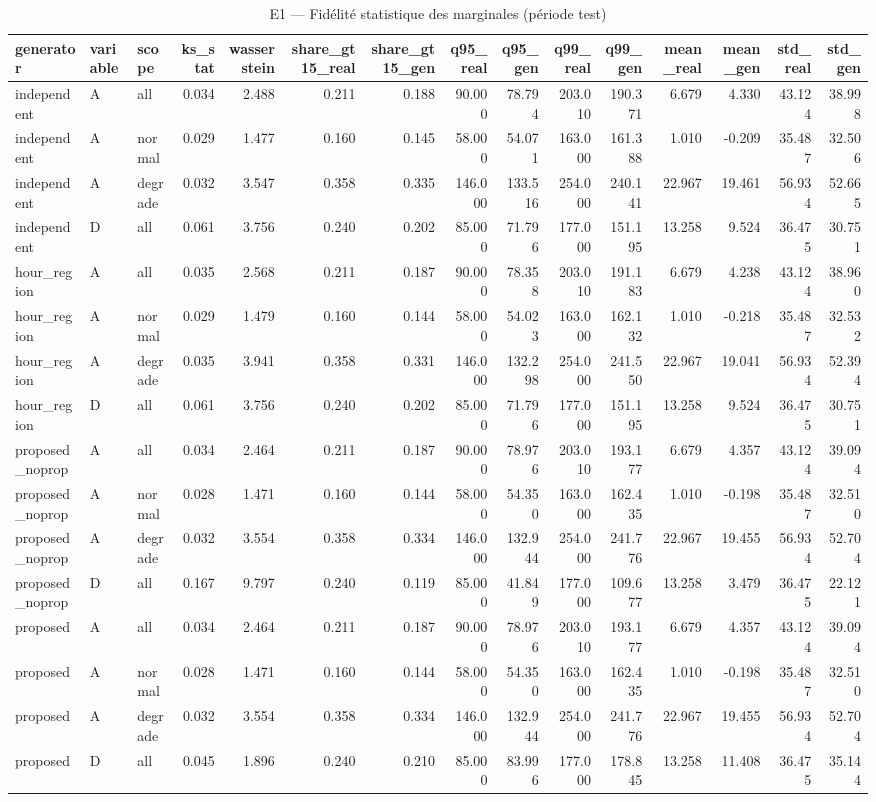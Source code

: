 \begin{table}
\caption{E1 — Fidélité statistique des marginales (période test)}
\label{tab:T1}
\begin{tabular}{lllrrrrrrrrrrrr}
\toprule
generator & variable & scope & ks\_stat & wasserstein & share\_gt15\_real & share\_gt15\_gen & q95\_real & q95\_gen & q99\_real & q99\_gen & mean\_real & mean\_gen & std\_real & std\_gen \\
\midrule
independent & A & all & 0.034 & 2.488 & 0.211 & 0.188 & 90.000 & 78.794 & 203.010 & 190.371 & 6.679 & 4.330 & 43.124 & 38.998 \\
independent & A & normal & 0.029 & 1.477 & 0.160 & 0.145 & 58.000 & 54.071 & 163.000 & 161.388 & 1.010 & -0.209 & 35.487 & 32.506 \\
independent & A & degrade & 0.032 & 3.547 & 0.358 & 0.335 & 146.000 & 133.516 & 254.000 & 240.141 & 22.967 & 19.461 & 56.934 & 52.665 \\
independent & D & all & 0.061 & 3.756 & 0.240 & 0.202 & 85.000 & 71.796 & 177.000 & 151.195 & 13.258 & 9.524 & 36.475 & 30.751 \\
hour\_region & A & all & 0.035 & 2.568 & 0.211 & 0.187 & 90.000 & 78.358 & 203.010 & 191.183 & 6.679 & 4.238 & 43.124 & 38.960 \\
hour\_region & A & normal & 0.029 & 1.479 & 0.160 & 0.144 & 58.000 & 54.023 & 163.000 & 162.132 & 1.010 & -0.218 & 35.487 & 32.532 \\
hour\_region & A & degrade & 0.035 & 3.941 & 0.358 & 0.331 & 146.000 & 132.298 & 254.000 & 241.550 & 22.967 & 19.041 & 56.934 & 52.394 \\
hour\_region & D & all & 0.061 & 3.756 & 0.240 & 0.202 & 85.000 & 71.796 & 177.000 & 151.195 & 13.258 & 9.524 & 36.475 & 30.751 \\
proposed\_noprop & A & all & 0.034 & 2.464 & 0.211 & 0.187 & 90.000 & 78.976 & 203.010 & 193.177 & 6.679 & 4.357 & 43.124 & 39.094 \\
proposed\_noprop & A & normal & 0.028 & 1.471 & 0.160 & 0.144 & 58.000 & 54.350 & 163.000 & 162.435 & 1.010 & -0.198 & 35.487 & 32.510 \\
proposed\_noprop & A & degrade & 0.032 & 3.554 & 0.358 & 0.334 & 146.000 & 132.944 & 254.000 & 241.776 & 22.967 & 19.455 & 56.934 & 52.704 \\
proposed\_noprop & D & all & 0.167 & 9.797 & 0.240 & 0.119 & 85.000 & 41.849 & 177.000 & 109.677 & 13.258 & 3.479 & 36.475 & 22.121 \\
proposed & A & all & 0.034 & 2.464 & 0.211 & 0.187 & 90.000 & 78.976 & 203.010 & 193.177 & 6.679 & 4.357 & 43.124 & 39.094 \\
proposed & A & normal & 0.028 & 1.471 & 0.160 & 0.144 & 58.000 & 54.350 & 163.000 & 162.435 & 1.010 & -0.198 & 35.487 & 32.510 \\
proposed & A & degrade & 0.032 & 3.554 & 0.358 & 0.334 & 146.000 & 132.944 & 254.000 & 241.776 & 22.967 & 19.455 & 56.934 & 52.704 \\
proposed & D & all & 0.045 & 1.896 & 0.240 & 0.210 & 85.000 & 83.996 & 177.000 & 178.845 & 13.258 & 11.408 & 36.475 & 35.144 \\
\bottomrule
\end{tabular}
\end{table}

